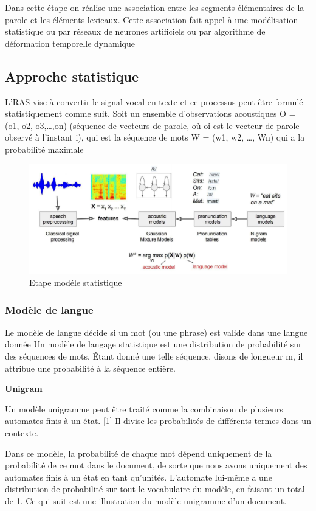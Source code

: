 \documentclass[a4paper, 12pt]{book}
\begin{document}
Dans cette étape on réalise une association entre les segments élémentaires de la parole et les éléments lexicaux. Cette association fait appel à une modélisation statistique ou par réseaux de neurones artificiels ou par algorithme de déformation temporelle dynamique

\subsection{Approche statistique}

L’RAS vise à convertir le signal vocal en texte et ce processus peut être formulé statistiquement comme suit. Soit un ensemble d'observations acoustiques O = (o1, o2, o3,…,on) (séquence de vecteurs de parole, où oi est le vecteur de parole observé à l'instant i), qui est la séquence de mots W = (w1, w2, …, Wn) qui a la probabilité maximale


\begin{figure}[htbp]
  \centering
  \includegraphics[width=1\linewidth]{fig/model.png}
  \caption{Etape modéle statistique}
\end{figure}

\subsubsection{Modèle de langue}

Le modèle de langue décide si un mot (ou une phrase) est valide dans une langue donnée Un modèle de langage statistique est une distribution de probabilité sur des séquences de mots. Étant donné une telle séquence, disons de longueur m, il attribue une probabilité à la séquence entière.

\textbf{Unigram}

Un modèle unigramme peut être traité comme la combinaison de plusieurs automates finis à un état. [1] Il divise les probabilités de différents termes dans un contexte.

Dans ce modèle, la probabilité de chaque mot dépend uniquement de la probabilité de ce mot dans le document, de sorte que nous avons uniquement des automates finis à un état en tant qu'unités. L'automate lui-même a une distribution de probabilité sur tout le vocabulaire du modèle, en faisant un total de 1. Ce qui suit est une illustration du modèle unigramme d'un document.
\end{document}
